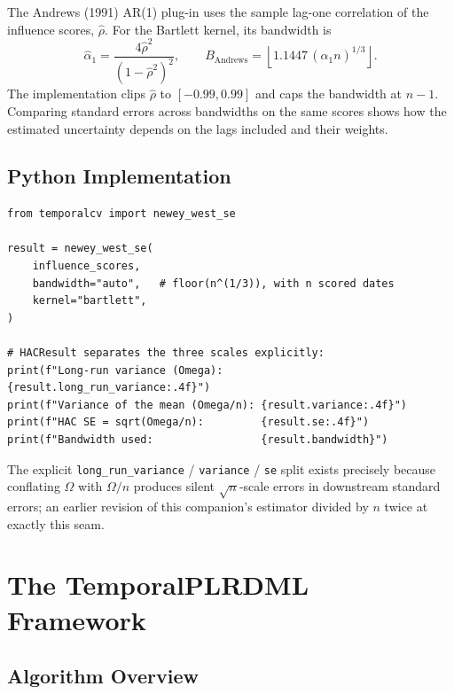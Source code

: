 The Andrews (1991) AR(1) plug-in uses the sample lag-one correlation of the influence scores, $\hat\rho$. For the Bartlett kernel, its bandwidth is
\begin{equation}
    \hat\alpha_1 = \frac{4\hat\rho^2}{(1-\hat\rho^2)^2},
    \qquad B_{\mathrm{Andrews}} = \left\lfloor 1.1447\,(\hat\alpha_1 n)^{1/3} \right\rfloor .
\end{equation}
The implementation clips $\hat\rho$ to $[-0.99,0.99]$ and caps the bandwidth at $n-1$. Comparing standard errors across bandwidths on the same scores shows how the estimated uncertainty depends on the lags included and their weights.

\subsection{Python Implementation}

\begin{verbatim}
from temporalcv import newey_west_se

result = newey_west_se(
    influence_scores,
    bandwidth="auto",   # floor(n^(1/3)), with n scored dates
    kernel="bartlett",
)

# HACResult separates the three scales explicitly:
print(f"Long-run variance (Omega):      {result.long_run_variance:.4f}")
print(f"Variance of the mean (Omega/n): {result.variance:.4f}")
print(f"HAC SE = sqrt(Omega/n):         {result.se:.4f}")
print(f"Bandwidth used:                 {result.bandwidth}")
\end{verbatim}

\begin{remark}
The explicit \texttt{long\_run\_variance} / \texttt{variance} /
\texttt{se} split exists precisely because conflating $\Omega$ with
$\Omega/n$ produces silent $\sqrt{n}$-scale errors in downstream standard
errors; an earlier revision of this companion's estimator divided by $n$
twice at exactly this seam.
\end{remark}

\section{The TemporalPLRDML Framework}\label{sec:temporal_plr_dml}

\subsection{Algorithm Overview}

